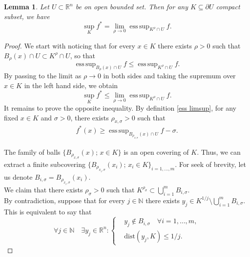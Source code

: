 \documentclass[a4paper,11pt]{article}
\numberwithin{equation}{section}
\newtheorem{Lemma}[Theorem]{Lemma}
\newcommand{\numberset}{\mathbb}
\newcommand{\N}{\numberset{N}}
\newcommand{\R}{\numberset{R}}
\DeclareMathOperator*{\esssup}{ess\,sup}
\theoremstyle{definition}
\begin{document}
\begin{Lemma}\label{lemma esssup}
Let $U\subset\R^n$ be on open bounded set. Then for any $K\subseteq\partial U$ compact subset, we have
$$
\sup_K f^*=\lim_{\rho\to0} \esssup_{K^\rho\cap U}f.
$$
\end{Lemma}
\begin{proof}
We start with noticing that for every $x\in K$ there exists $\rho>0$ such that $B_\rho(x)\cap U\subset K^\rho\cap U$, so that
$$
\esssup_{B_\rho(x)\cap U}f\leq \esssup_{K^\rho\cap U}f.
$$
By passing to the limit as $\rho\to0$ in both sides and taking the supremum over $x\in K$ in the left hand side, we obtain
$$
\sup_K f^*\leq\lim_{\rho\to0} \esssup_{K^\rho\cap U}f.
$$
It remains to prove the opposite inequality. By definition \ref{ess limsup}, for any fixed $x\in K$ and $\sigma>0$, there exists $\rho_{x,\sigma}>0$ such that 
\begin{align}\label{def of lim}
f^*(x)\geq\esssup_{B_{\rho_{x,\sigma}}(x)\cap U}f-\sigma.
\end{align}

The family of balls $\{B_{\rho_{x,\sigma}}(x); \,x\in K\}$ is an open covering of $K$. Thus, we can extract a finite subcovering $\{B_{\rho_{x_i,\sigma}}(x_i); \,x_i\in K\} _{i=1,\ldots,m}$.
For seek of brevity, let us denote $B_{i,\sigma}=B_{\rho_{x_i,\sigma}}(x_i)$.\\
We claim that there exists $\rho_\sigma>0$ such that $K^{\rho_\sigma}\subset \bigcup_{i=1}^m B_{i,\sigma}$.\\
By contradiction, suppose that for every $j\in\N$ there exists $y_j\in K^{1/j}\setminus\bigcup_{i=1}^m B_{i,\sigma}$. This is equivalent to say that 
\begin{equation}\label{contr}
\forall j\in\N\quad\exists y_j\in\R^n:\left\{
\begin{aligned}
 &y_j\notin B_{i,\sigma}\quad\forall i=1,\ldots,m,\\
&\mathrm{dist}(y_j,K)\leq 1/j.
\end{aligned}
\right.
\end{equation}

\end{proof}
\end{document}
